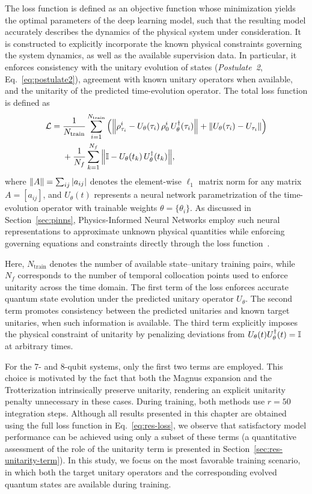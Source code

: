 The loss function is defined as an objective function whose minimization yields the optimal parameters of the deep learning model, such that the resulting model accurately describes the dynamics of the physical system under consideration. It is constructed to explicitly incorporate the known physical constraints governing the system dynamics, as well as the available supervision data. In particular, it enforces consistency with the unitary evolution of states (\textit{Postulate~2}, Eq.~\eqref{eq:postulate2}), agreement with known unitary operators when available, and the unitarity of the predicted time-evolution operator. The total loss function is defined as
\begin{align}
  \label{eq:res-loss}
  \mathcal{L} ={}& \frac{1}{N_{\mathrm{train}}} \sum_{i=1}^{N_{\mathrm{train}}} \qty( \norm{ \rho_{\tau_i}^i - U_{\theta}(\tau_i)\, \rho_0^i\, U_{\theta}^{\dagger}(\tau_i) }
  + \norm{ U_{\theta}(\tau_i) - U_{\tau_i} } ) \nonumber \\
  & + \frac{1}{N_f} \sum_{k=1}^{N_f} \norm{ \mathbb{I} - U_{\theta}(t_k)\, U_{\theta}^{\dagger}(t_k) },
\end{align}
where $\norm{A} = \sum_{ij} |a_{ij}|$ denotes the element-wise $\ell_1$ matrix norm for any matrix $A = [a_{ij}]$, and $U_{\theta}(t)$ represents a neural network parametrization of the time-evolution operator with trainable weights $\theta = \{ \theta_i \}$. As discussed in Section~\ref{sec:pinns}, Physics-Informed Neural Networks employ such neural representations to approximate unknown physical quantities while enforcing governing equations and constraints directly through the loss function~\cite{Raissi2019}.

Here, $N_{\mathrm{train}}$ denotes the number of available state--unitary training pairs, while $N_f$ corresponds to the number of temporal collocation points used to enforce unitarity across the time domain. The first term of the loss enforces accurate quantum state evolution under the predicted unitary operator $U_{\theta}$. The second term promotes consistency between the predicted unitaries and known target unitaries, when such information is available. The third term explicitly imposes the physical constraint of unitarity by penalizing deviations from $U_{\theta}(t) U_{\theta}^{\dagger}(t) = \mathbb{I}$ at arbitrary times.

For the 7- and 8-qubit systems, only the first two terms are employed. This choice is motivated by the fact that both the Magnus expansion and the Trotterization intrinsically preserve unitarity, rendering an explicit unitarity penalty unnecessary in these cases. During training, both methods use $r = 50$ integration steps. Although all results presented in this chapter are obtained using the full loss function in Eq.~\eqref{eq:res-loss}, we observe that satisfactory model performance can be achieved using only a subset of these terms (a quantitative assessment of the role of the unitarity term is presented in Section~\ref{sec:res-unitarity-term}). In this study, we focus on the most favorable training scenario, in which both the target unitary operators and the corresponding evolved quantum states are available during training.

